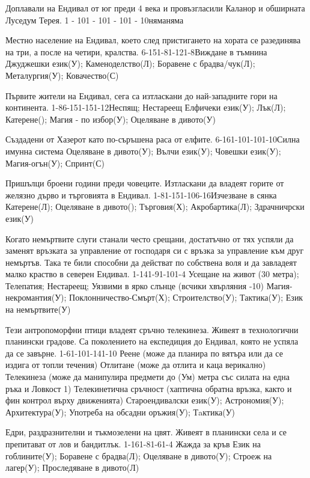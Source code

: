 \begin{multicols}{2}
{Доплавали на Ендивал от юг преди 4 века и провъзгласили Каланор и обширната Луседум Терея.}
{1 - 10}{1 - 10}{1 - 10}{1 - 10}{няма}{няма}

{Местно население на Ендивал, което след пристигането на хората се разединява на три, а после на четири, кралства.}
{6-15}{1-8}{1-12}{1-8}{Виждане в тъмнина}
{
Джуджешки език(У);
Каменоделство(Л);
Боравене с брадва/чук(Л);
Металургия(У);
Ковачество(С)
}

{Първите жители на Ендивал, сега са изтласкани до най-западните гори на континента.}
{1-8}{6-15}{1-15}{1-12}{Неспящ; Нестареещ}
{
Елфичеки език(У);
Лък(Л);
Катерене();
Магия - по избор(У);
Оцеляване в дивото(У)
}

{Създадени от Хазерот като по-съръшена раса от елфите.}
{6-16}{1-10}{1-10}{1-10}{Силна имунна система}
{
Оцеляване в дивото(У);
Вълчи език(У);
Човешки език(У);
Магия-огън(У);
Спринт(С)
}

{Пришълци броени години преди човеците. Изтласкани да владеят горите от желязно дърво и търговията в Ендивал.}
{1-8}{1-15}{1-10}{6-16}{Изчезване в сянка}
{
Катерене(Л);
Оцеляване в дивото();
Търговия(Х);
Акробартика(Л);
Здрачничрски език(У)
}

{Когато немъртвите слуги станали често срещани, достатъчно от тях успяли да заменят връзката за управление от господаря си с връзка за управление към друг немъртъв.
Така те били способни да действат по собствена воля и да завладеят малко краство в северен Ендивал.}
{1-14}{1-9}{1-10}{1-4}
{
Усещане на живот (30 метра);
Телепатия;
Нестареещ;
Уязвими в ярко слънце (всчики хвърляния -10)
}
{
Магия-некромантия(У);
Поклонничество-Смърт(Х);
Строителство(У);
Тактика(У); %
Език на немъртвите(У)
}

{Тези антропоморфни птици владеят сръчно телекинеза.
Живеят в технологични планински градове.
Са поколението на експедиция до Ендивал, която не успяла да се завърне.}
{1-6}{1-10}{1-14}{1-10}
{
Реене (може да планира по вятъра или да се издига от топли течения)
Отлитане (може да отлита и каца верикално)
Телекинеза (може да манипулира предмети до (Ум) метра със силата на една ръка и Ловкост 1)
Телекинетична сръчност (хаптична обратна връзка, както и фин контрол върху движенията)
}
{
Староендивалски език(У);
Астрономия(У);
Архитектура(У);
Употреба на обсадни оръжия(У);
Тaктика(У)
}

{Едри, раздразнителни и тъкмозелени на цвят.
Живеят в планински села и се препитават от лов и бандитлък.}
{1-16}{1-8}{1-6}{1-4}
{
Жажда за кръв %
}
{
Език на гоблините(У);
Боравене с брадва(Л);
Оцеляване в дивото(У);
Строеж на лагер(У);
Проследяване в дивото(Л)
}


\end{multicols}

